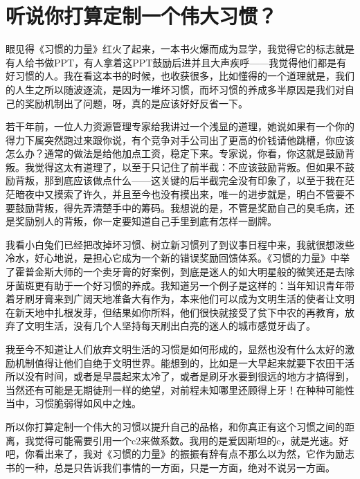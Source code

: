 \hypertarget{ux542cux8bf4ux4f60ux6253ux7b97ux5b9aux5236ux4e00ux4e2aux4f1fux5927ux4e60ux60ef}{%
\section{听说你打算定制一个伟大习惯？}\label{ux542cux8bf4ux4f60ux6253ux7b97ux5b9aux5236ux4e00ux4e2aux4f1fux5927ux4e60ux60ef}}

眼见得《习惯的力量》红火了起来，一本书火爆而成为显学，我觉得它的标志就是有人给书做PPT，有人拿着这PPT鼓励后进并且大声疾呼------我觉得他们都是有好习惯的人。我在看这本书的时候，也收获很多，比如懂得的一个道理就是，我们的人生之所以随波逐流，是因为一堆坏习惯，而坏习惯的养成多半原因是我们对自己的奖励机制出了问题，呀，真的是应该好好反省一下。

若干年前，一位人力资源管理专家给我讲过一个浅显的道理，她说如果有一个你的得力下属突然跑过来跟你说，有个竞争对手公司出了更高的价钱请他跳槽，你应该怎么办？通常的做法是给他加点工资，稳定下来。专家说，你看，你这就是鼓励背叛。我觉得这太有道理了，以至于只记住了前半截：不应该鼓励背叛。但如果不鼓励背叛，那到底应该做点什么------这关键的后半截完全没有印象了，以至于我在茫茫暗夜中又摸索了许久，并且至今也没有摸出来，唯一的进步就是，明白不管要不要鼓励背叛，得先弄清楚手中的筹码。我想说的是，不管是奖励自己的臭毛病，还是奖励别人的背叛，你一定要知道自己手里到底有怎样一副牌。

我看小白兔们已经把改掉坏习惯、树立新习惯列了到议事日程中来，我就很想泼些冷水，好心地说，是担心它成为一个新的错误奖励回馈体系。《习惯的力量》中举了霍普金斯大师的一个卖牙膏的好案例，到底是迷人的如大明星般的微笑还是去除牙菌斑更有助于一个好习惯的养成。我知道另一个例子是这样的：当年知识青年带着牙刷牙膏来到广阔天地准备大有作为，本来他们可以成为文明生活的使者让文明在新天地中扎根发芽，但结果如你所料，他们很快就接受了贫下中农的再教育，放弃了文明生活，没有几个人坚持每天刷出白亮的迷人的城市感觉牙齿了。

我至今不知道让人们放弃文明生活的习惯是如何形成的，显然也没有什么太好的激励机制值得让他们自绝于文明世界。能想到的，比如是一大早起来就要下农田干活所以没有时间，或者是早晨起来太冷了，或者是刷牙水要到很远的地方才搞得到，当然还有可能是无期徒刑一样的绝望，对前程未知哪里还顾得上牙！在种种可能性当中，习惯脆弱得如风中之烛。

所以你打算定制一个伟大的习惯以提升自己的品格，和你真正有这个习惯之间的距离，我觉得可能需要引用一个c2来做系数。我用的是爱因斯坦的c，就是光速。好吧，你看出来了，我对《习惯的力量》的振振有辞有点不那么以为然，它作为励志书的一种，总是只告诉我们事情的一方面，只是一方面，绝对不说另一方面。

